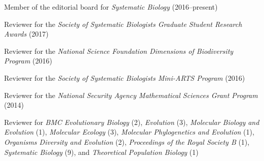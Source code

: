 \myHangIndent
Member of the editorial board for \emph{Systematic Biology} (2016--present)

\myHangIndent
Reviewer for the
    \emph{Society of Systematic Biologists Graduate Student Research Awards} (2017)

\myHangIndent
Reviewer for the
    \emph{National Science Foundation Dimensions of Biodiversity Program} (2016)

\myHangIndent
Reviewer for the
    \emph{Society of Systematic Biologists Mini-ARTS Program} (2016)

\myHangIndent
Reviewer for the
    \emph{National Security Agency Mathematical Sciences Grant Program} (2014)


\myHangIndent
Reviewer for
    \emph{BMC Evolutionary Biology} (2),
    \emph{Evolution} (3),
    \emph{Molecular Biology and Evolution} (1),
    \emph{Molecular Ecology} (3),
    \emph{Molecular Phylogenetics and Evolution} (1),
    \emph{Organisms Diversity and Evolution} (2),
    \emph{Proceedings of the Royal Society B} (1),
    \emph{Systematic Biology} (9),
    and
    \emph{Theoretical Population Biology} (1)


